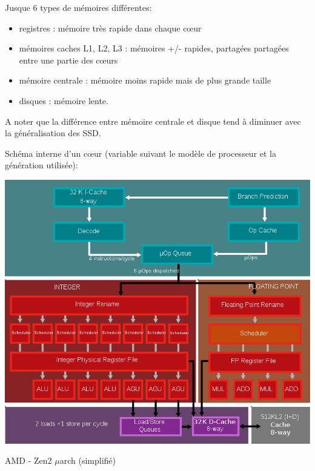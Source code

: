 \documentclass{beamer}
\begin{document}
\begin{frame}
\end{frame}

\begin{frame}
Jusque 6 types de mémoires différentes:
\begin{itemize}
\item registres : mémoire très rapide dans chaque cœur
\item mémoires caches L1, L2, L3 : mémoires +/- rapides, partagées partagées entre une partie des cœurs
\item mémoire centrale : mémoire moins rapide mais de plus grande taille
\item disques : mémoire lente.
\end{itemize}

A noter que la différence entre mémoire centrale et disque tend à diminuer avec la généralisation des SSD.

\end{frame}

\begin{frame}
Schéma interne d'un c\oe ur (variable suivant le mod\`ele de processeur et la g\'en\'eration utilis\'ee):

\begin{center}
	\includegraphics[scale=0.25]{../Images/800px-Zen2_Microarchitektur.svg.png}
	
	AMD - Zen2 $\mu$arch (simplifi\'e)
\end{center}

\end{frame}
\end{document}
